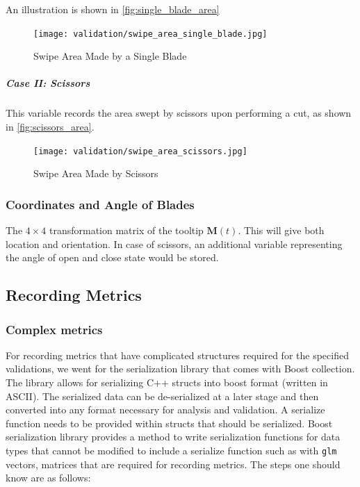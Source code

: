 An illustration is shown in \autoref{fig:single_blade_area}

\begin{figure}
  \centering%
  \texttt{[image: validation/swipe\_area\_single\_blade.jpg]}
  \caption{Swipe Area Made by a Single Blade}
  \label{fig:single_blade_area}
\end{figure}

\subparagraph{Case II: Scissors}

This variable records the area swept by scissors upon performing a cut, as shown in \autoref{fig:scissors_area}.

\begin{figure}
  \centering%
  \texttt{[image: validation/swipe\_area\_scissors.jpg]}
  \caption{Swipe Area Made by Scissors}
  \label{fig:scissors_area}
\end{figure}

\subsubsection{Coordinates and Angle of Blades}
\label{para:data_coordinates_of_blades}

The $4\times 4$ transformation matrix of the tooltip $\mathbf{M}(t)$. This will give both location and orientation. In case of scissors, an additional variable representing the angle of open and close state would be stored.


\subsection{Recording Metrics}
\label{chp:literature}

\subsubsection{Complex metrics}
For recording metrics that have complicated structures required for the specified validations, we went for the serialization library that comes with Boost collection. The library allows for serializing C++ structs into boost format (written in ASCII). The serialized data can be de-serialized at a later stage and then converted into any format necessary for analysis and validation. A serialize function needs to be provided within structs that should be serialized. Boost serialization library provides a method to write serialization functions for data types that cannot be modified to include a serialize function such as with \texttt{glm} vectors, matrices that are required for recording metrics. The steps one should know are as follows:

